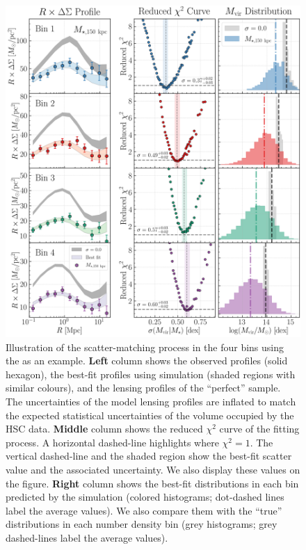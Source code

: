 \documentclass[fleqn,usenatbib,useAMS,english]{mnras}
\begin{document}
  \begin{figure}
      \centering
      \includegraphics[width=\textwidth]{figure/topn_fig_appendix_1}
      \caption{
          Illustration of the scatter-matching process in the four \topn{} bins using the
           as an example.
          \textbf{Left} column shows the observed \rdsigma{} profiles (solid hexagon), the best-fit
          profiles using  simulation (shaded regions with similar colours), and the
          lensing profiles of the ``perfect'' \topn{} sample.
          The uncertainties of the model lensing profiles are inflated to match the expected
          statistical uncertainties of the volume occupied by the HSC data.
          \textbf{Middle} column shows the reduced $\chi^{2}$ curve of the fitting process.
          A horizontal dashed-line highlights where $\chi^{2}=1$.
          The vertical dashed-line and the shaded region show the best-fit scatter value and the
          associated uncertainty. We also display these values on the figure.
          \textbf{Right} column shows the best-fit \mvir{} distributions in each bin predicted
          by the  simulation (colored histograms; dot-dashed lines label the average
          \mvir{} values).
          We also compare them with the ``true'' \mvir{} distributions in each number density bin
          (grey histograms; grey dashed-lines label the average \mvir{} values).
      }
      \label{fig:fitting}
  \end{figure}
\end{document}
